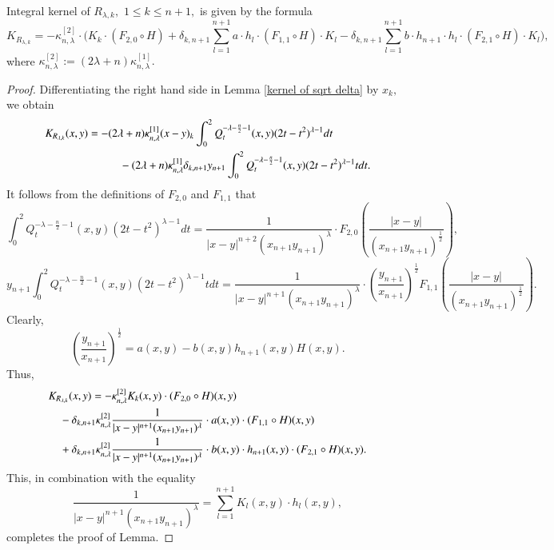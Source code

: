 \documentclass{amsart}
\begin{document}
\begin{lemma}\label{bessel-riesz kernel representation lemma} Integral kernel of $R_{\lambda,k},$ $1\leq k\leq n+1,$ is given by the formula
$$K_{R_{\lambda,k}}=-\kappa^{[2]}_{n,\lambda}\cdot\Big(K_k\cdot (F_{2,0}\circ H)+\delta_{k,n+1}\sum_{l=1}^{n+1}a\cdot h_l\cdot (F_{1,1}\circ H)\cdot K_l-\delta_{k,n+1}\sum_{l=1}^{n+1}b\cdot h_{n+1}\cdot h_l\cdot (F_{2,1}\circ H)\cdot K_l\Big),$$
where $\kappa^{[2]}_{n,\lambda}:=(2\lambda+n)\kappa^{[1]}_{n,\lambda}.$
\end{lemma}
\begin{proof} Differentiating the right hand side in Lemma \ref{kernel of sqrt delta} by $x_{k},$ we obtain
\begin{align*}
K_{R_{\lambda,k}}(x,y)&=-(2\lambda+n)\kappa^{[1]}_{n,\lambda}(x-y)_{k}\int_0^2Q_t^{-\lambda-\frac{n}{2}-1}(x,y)(2t-t^2)^{\lambda-1}dt\\
&\hspace{1.0cm}-(2\lambda+n)\kappa^{[1]}_{n,\lambda}\delta_{k,n+1}y_{n+1}\int_0^2Q_t^{-\lambda-\frac{n}{2}-1}(x,y)(2t-t^2)^{\lambda-1}tdt.
\end{align*}
It follows from the definitions of $F_{2,0}$ and $F_{1,1}$ that
$$\int_0^2Q_t^{-\lambda-\frac{n}{2}-1}(x,y)(2t-t^2)^{\lambda-1}dt=\frac1{|x-y|^{n+2}(x_{n+1}y_{n+1})^{\lambda}}\cdot F_{2,0}(\frac{|x-y|}{(x_{n+1}y_{n+1})^{\frac12}}),$$
$$y_{n+1}\int_0^2Q_t^{-\lambda-\frac{n}{2}-1}(x,y)(2t-t^2)^{\lambda-1}tdt=\frac1{|x-y|^{n+1}(x_{n+1}y_{n+1})^{\lambda}}\cdot (\frac{y_{n+1}}{x_{n+1}})^{\frac12}F_{1,1}(\frac{|x-y|}{(x_{n+1}y_{n+1})^{\frac12}}).$$
Clearly,
$$(\frac{y_{n+1}}{x_{n+1}})^{\frac12}=a(x,y)-b(x,y)h_{n+1}(x,y)H(x,y).$$
Thus,
\begin{align*}
K_{R_{\lambda,k}}(x,y)&=-\kappa^{[2]}_{n,\lambda}K_k(x,y)\cdot (F_{2,0}\circ H)(x,y)\\
&\hspace{-1.0cm}-\delta_{k,n+1}\kappa^{[2]}_{n,\lambda}\frac1{|x-y|^{n+1}(x_{n+1}y_{n+1})^{\lambda}}\cdot a(x,y)\cdot (F_{1,1}\circ H)(x,y)\\
&\hspace{-1.0cm}+\delta_{k,n+1}\kappa^{[2]}_{n,\lambda}\frac1{|x-y|^{n+1}(x_{n+1}y_{n+1})^{\lambda}}\cdot b(x,y)\cdot h_{n+1}(x,y)\cdot (F_{2,1}\circ H)(x,y).
\end{align*}
This, in combination with the equality
$$\frac1{|x-y|^{n+1}(x_{n+1}y_{n+1})^{\lambda}}=\sum_{l=1}^{n+1}K_l(x,y)\cdot h_l(x,y),$$
completes the proof of Lemma.
\end{proof}
\end{document}
